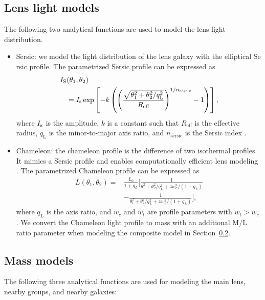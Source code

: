 \documentclass[useAMS,usenatbib]{mnras}
\newcommand{\sref}[1]{Section~\ref{#1}}
\begin{document}
\subsection{Lens light models}
\label{sec:light_model}
The following two analytical functions are used to model the lens light distribution.
\begin{itemize}
    \item \textsf{S$\acute{\text{e}}$rsic:} we model the light distribution of the lens galaxy with the elliptical S$\acute{\text{e}}$rsic profile. The parametrized S$\acute{\text{e}}$rsic profile can be expressed as
    \begin{equation}\label{eq:sersic}
    \begin{split}
    I_{\rm S}&(\theta_{1},\theta_{2}) \\
    &=I_{\rm s}\,\mathrm{exp}\left[-k\left(\left(\frac{\sqrt{\theta_{1}^{2}+\theta_{2}^{2}/q_{\text{L}}^{2}}}{R_{\text{eff}}}\right)^{1/n_{\text{s}\acute{\text{e}}\text{rsic}}}-1\right)\right],
    \end{split}
    \end{equation}
    where $I_{\rm s}$ is the amplitude, $k$ is a constant such that
    $R_{\text{eff}}$ is the effective radius, $q_{\text{L}}$ is the minor-to-major axis ratio, and $n_{\text{s}\acute{\text{e}}\text{rsic}}$ is the
    S$\acute{\text{e}}$rsic index \citep{Sersic68}. 
    \item \textsf{Chameleon:} the chameleon profile is the difference of two isothermal profiles. It mimics a S$\acute{\text{e}}$rsic profile and enables computationally efficient lens modeling \citep{DuttonEtal11}. The parametrized Chameleon profile can be expressed as 
    \begin{equation}
    \label{eq:chameleon}
    \begin{split}
    L(\theta_{1},\theta_{2})=&\frac{L_{0}}{1+q_{L}}[\frac{1}{\theta_{1}^2+\theta_{2}^2/q_{L}^2+4w_{c}^2/(1+q_{L})}\\
    &-\frac{1}{\theta_{1}^2+\theta_{2}^2/q_{L}^2+4w_{t}^2/(1+q_{L})}],
    \end{split}
    \end{equation}
    where $q_{L}$ is the axis ratio, and $w_{c}$ and $w_{t}$ are profile parameters with $w_{t}>w_{c}$ \citep{SuyuEtal14}. 
    We convert the Chameleon light profile to mass with an additional M/L ratio parameter when modeling the composite model in \sref{sec:mass_model}.
\end{itemize}

\subsection{Mass models}
\label{sec:mass_model}
The following three analytical functions are used for modeling the main lens, nearby groups, and nearby galaxies:
\end{document}
